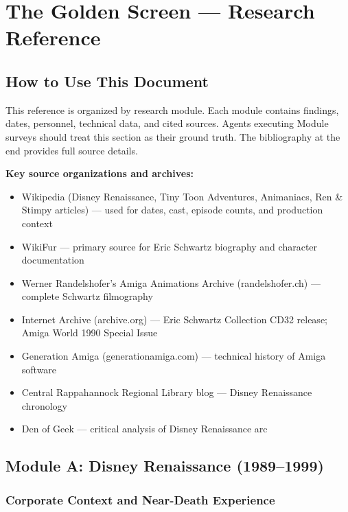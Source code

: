 \documentclass[11pt,letterpaper]{article}
\newcommand{\stageheader}[2]{%
  \noindent\colorbox{#2}{\makebox[\textwidth][l]{%
    \textcolor{white}{\bfseries\sffamily\hspace{6pt}#1\hspace{6pt}}}}%
  \vspace{0.5em}\par%
}
\begin{document}
\newpage

\stageheader{STAGE 2 --- RESEARCH REFERENCE}{secondary}

\section{The Golden Screen --- Research Reference}

\subsection{How to Use This Document}

This reference is organized by research module. Each module contains findings, dates, personnel, technical data, and cited sources. Agents executing Module surveys should treat this section as their ground truth. The bibliography at the end provides full source details.

\textbf{Key source organizations and archives:}
\begin{itemize}[leftmargin=2em]
  \item Wikipedia (Disney Renaissance, Tiny Toon Adventures, Animaniacs, Ren \& Stimpy articles) --- used for dates, cast, episode counts, and production context
  \item WikiFur --- primary source for Eric Schwartz biography and character documentation
  \item Werner Randelshofer's Amiga Animations Archive (randelshofer.ch) --- complete Schwartz filmography
  \item Internet Archive (archive.org) --- Eric Schwartz Collection CD32 release; Amiga World 1990 Special Issue
  \item Generation Amiga (generationamiga.com) --- technical history of Amiga software
  \item Central Rappahannock Regional Library blog --- Disney Renaissance chronology
  \item Den of Geek --- critical analysis of Disney Renaissance arc
\end{itemize}

\subsection{Module A: Disney Renaissance (1989--1999)}

\subsubsection{Corporate Context and Near-Death Experience}
\end{document}
